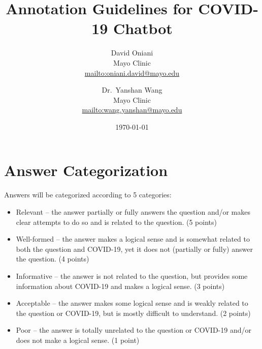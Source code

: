 \documentclass[11pt]{article}
\author{David Oniani\\
        Mayo Clinic\\
        \href{mailto:oniani.david@mayo.edu}{mailto:oniani.david@mayo.edu}
        \and
        Dr.~Yanshan Wang\\
        Mayo Clinic\\
        \href{mailto:wang.yanshan@mayo.edu}{mailto:wang.yanshan@mayo.edu}}
\title{\textbf{Annotation Guidelines for COVID-19 Chatbot}}
\date{\today}
\begin{document}
\maketitle


\tableofcontents
\newpage


\section{Answer Categorization}

Answers will be categorized according to 5 categories:

\begin{itemize}
  \item	Relevant -- the answer partially or fully answers the question and/or
        makes clear attempts to do so and is related to the question.
        (5 points)

  \item	Well-formed -- the answer makes a logical sense and is somewhat related
        to both the question and COVID-19, yet it does not (partially or fully)
        answer the question.
        (4 points)

  \item	Informative -- the answer is not related to the question, but provides
        some information about COVID-19 and makes a logical sense.
        (3 points)

  \item	Acceptable -- the answer makes some logical sense and is weakly related
        to the question or COVID-19, but is mostly difficult to understand.
        (2 points)

  \item	Poor -- the answer is totally unrelated to the question or COVID-19
        and/or does not make a logical sense.
        (1 point)
\end{itemize}

\end{document}
